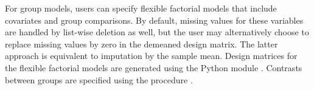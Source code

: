 For group models, users can specify flexible factorial models that include
covariates and group comparisons. By default, missing values for these
variables are handled by list-wise deletion as well, but the user may
alternatively choose to replace missing values by zero in the demeaned
design matrix. The latter approach is equivalent to imputation by the
sample mean. Design matrices for the flexible factorial models are
generated using the Python module 
\parencite{nathaniel_j_smith_2018_1472929}. Contrasts between groups are
specified using the  procedure \parencite{jssv069i01}.


